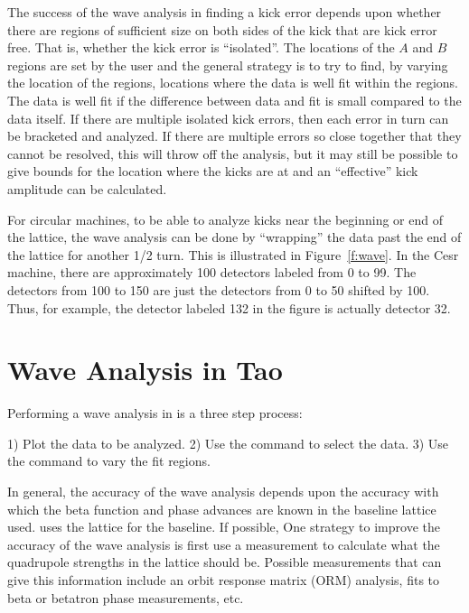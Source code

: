 The success of the wave analysis in finding a kick error depends upon whether there are regions of
sufficient size on both sides of the kick that are kick error free. That is, whether the kick error
is ``isolated''. The locations of the $A$ and $B$ regions are set by the user and the general
strategy is to try to find, by varying the location of the regions, locations where the data is well
fit within the regions. The data is well fit if the difference between data and fit is small
compared to the data itself. If there are multiple isolated kick errors, then each error in turn can
be bracketed and analyzed. If there are multiple errors so close together that they cannot be
resolved, this will throw off the analysis, but it may still be possible to give bounds for the
location where the kicks are at and an ``effective'' kick amplitude can be calculated.

For circular machines, to be able to analyze kicks near the beginning or end of the lattice, the
wave analysis can be done by ``wrapping'' the data past the end of the lattice for another 1/2
turn. This is illustrated in Figure~\ref{f:wave}. In the Cesr machine, there are approximately 100
detectors labeled from 0 to 99.  The detectors from 100 to 150 are just the detectors from 0 to 50
shifted by 100. Thus, for example, the detector labeled 132 in the figure is actually detector 32.

\section{Wave Analysis in Tao}
\label{s:wave.tao}

Performing a wave analysis in \tao is a three step process:
\begin{example}
  1) Plot the data to be analyzed.
  2) Use the  command to select the data.
  3) Use the  command to vary the fit regions.
\end{example}

In general, the accuracy of the wave analysis depends upon the accuracy with which the beta function
and phase advances are known in the baseline lattice used. \tao uses the  lattice for the
baseline. If possible, One strategy to improve the accuracy of the wave analysis is first use a
measurement to calculate what the quadrupole strengths in the  lattice should be. Possible
measurements that can give this information include an orbit response matrix (ORM) analysis, fits to
beta or betatron phase measurements, etc.


